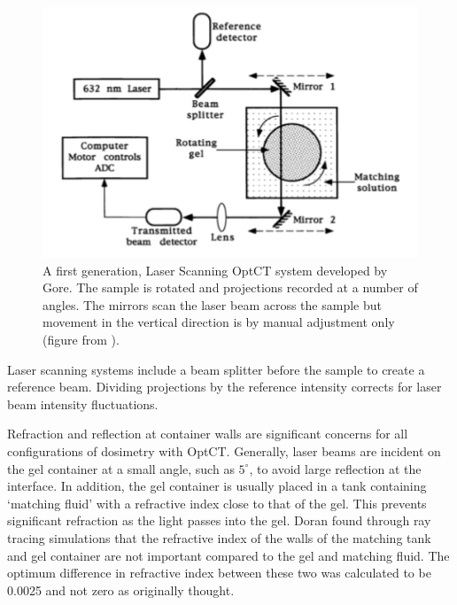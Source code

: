 \documentclass[12pt]{article}
\begin{document}
 


\begin{figure}[H]
\centering
\includegraphics[scale=0.6]{Gore_setup.pdf}
\caption{A first generation,  Laser Scanning OptCT system developed by Gore. The sample is rotated and projections recorded at a number of angles. The  mirrors scan the laser beam across the sample but movement in the vertical direction is by manual adjustment only (figure from \cite{Gore:1999tg}). }
\label{fig:gore_setup}
\end{figure}


Laser scanning systems include a  beam splitter before the sample to create a reference beam. Dividing projections by the reference intensity  corrects for laser beam intensity fluctuations. \cite{Gore:1999tg}

Refraction and reflection at container walls are significant concerns for all configurations of dosimetry with OptCT. Generally, laser beams are incident on the gel container at a small angle, such as $5^{\circ}$, to avoid large reflection at the interface. In addition, the gel container is usually placed in a tank containing `matching fluid' with a refractive index close to that of the gel. This prevents significant refraction as the light passes into the gel. Doran found through ray tracing simulations that the refractive index of the walls of the matching tank and  gel container are not important compared to the gel and matching fluid. The optimum difference in refractive index between these two was calculated to be 0.0025 and not zero as originally thought.\cite{Doran:2001ee}
\end{document}
